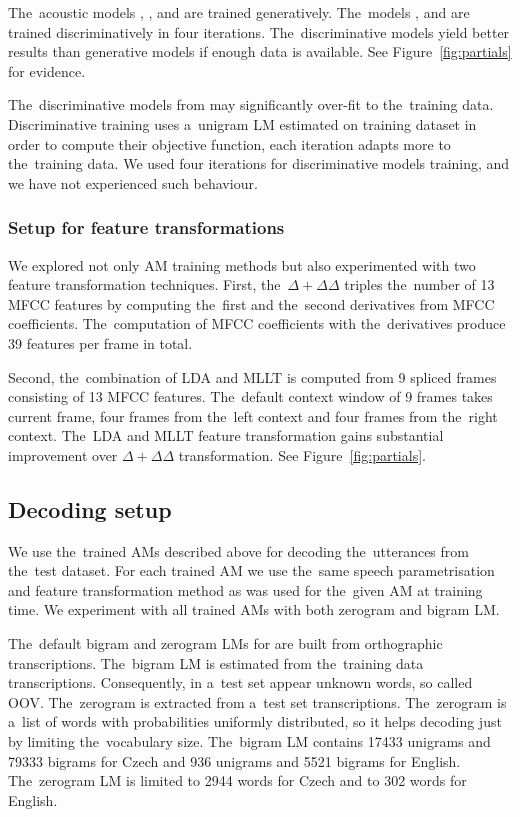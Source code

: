 The~acoustic models , ,  and  are trained generatively.
The~models ,  and  are trained discriminatively in four iterations.
The~discriminative models yield better results than generative models if enough data is available. 
See Figure~\ref{fig:partials} for evidence.

The~discriminative models from may significantly over-fit to the~training data.
Discriminative training uses a~unigram \ac{LM} estimated on training dataset in order to compute their objective function, each iteration adapts more to the~training data.
We used four iterations for discriminative models training, and we have not experienced such behaviour.

\subsubsection*{Setup for feature transformations}
We explored not only \ac{AM} training methods but also experimented with two feature transformation techniques.
First, the~$\Delta + \Delta\Delta$ triples the~number of 13 \ac{MFCC} features by computing the~first and the~second derivatives from \ac{MFCC} coefficients. 
The~computation of \ac{MFCC} coefficients with the~derivatives produce 39 features per frame in total.

Second, the~combination of \ac{LDA} and \ac{MLLT} is computed from 9 spliced frames consisting of 13 \ac{MFCC} features. 
The~default context window of 9 frames takes current frame, four frames from the~left context and four frames from the~right context.
The~\ac{LDA} and \ac{MLLT} feature transformation gains substantial improvement over $\Delta+\Delta\Delta$ transformation.
See Figure~\ref{fig:partials}.

\subsection*{Decoding setup}
We use the~trained \acp{AM} described above for decoding the~utterances from the~test dataset.
For each trained \ac{AM} we use the~same speech parametrisation and feature transformation method as was used for the~given \ac{AM} at training time.
We experiment with all trained \acp{AM} with both zerogram and bigram \ac{LM}.

The~default bigram and zerogram \acp{LM} for are built from orthographic transcriptions.
The~bigram \ac{LM} is estimated from the~training data transcriptions. 
Consequently, in a~test set appear unknown words, so called \acl{OOV}.
The~zerogram is extracted from a~test set transcriptions.
The~zerogram is a~list of words with probabilities uniformly distributed, so it helps decoding just by limiting the~vocabulary size.
The~bigram \ac{LM} contains 17433 unigrams and 79333 bigrams for Czech and 936 unigrams and 5521 bigrams for English. 
The~zerogram \ac{LM} is limited to 2944 words for Czech and to 302 words for English.

